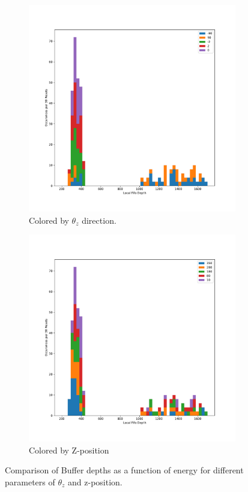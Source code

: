 \begin{figure}
\centering
\begin{subfigure}{.5\textwidth}
  \centering
  \includegraphics[width=\textwidth]{images/df_theta_cut.pdf}
  \caption{Colored by $\theta_{z}$ direction.}
\end{subfigure}%
\begin{subfigure}{.5\textwidth}
  \centering
  \includegraphics[width=\textwidth]{images/df_zpos_cut.pdf}
  \caption{Colored by Z-position}
\end{subfigure}
\caption{Comparison of Buffer depths as a function of energy for different parameters of $\theta_{z}$ and z-position.}
\label{fig:compare_integral_zpos_theta}
\end{figure}

